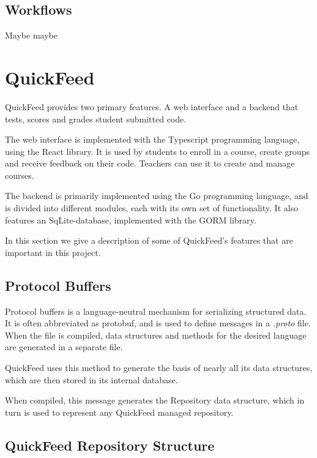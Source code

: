 \subsection{Workflows}

Maybe maybe

\section{QuickFeed}
QuickFeed provides two primary features.
A web interface and a backend that tests, scores and grades student submitted code.

The web interface is implemented with the Typescript programming language, using the React library.
It is used by students to enroll in a course, create groups and receive feedback on their code.
Teachers can use it to create and manage courses.

The backend is primarily implemented using the Go programming language, and is divided into different modules, each with its own set of functionality.
It also features an SqLite-database, implemented with the GORM library.

In this section we give a description of some of QuickFeed's features that are important in this project.

\subsection{Protocol Buffers}
Protocol buffers is a language-neutral mechanism for serializing structured data. %
It is often abbreviated as protobuf, and is used to define messages in a \textit{.proto} file.
When the file is compiled, data structures and methods for the desired language are generated in a separate file.

QuickFeed uses this method to generate the basis of nearly all its data structures, which are then stored in its internal database.



When compiled, this message generates the Repository data structure, which in turn is used to represent any QuickFeed managed repository.

\subsection{QuickFeed Repository Structure}
\label{sec:quickfeed-repository-structure}

